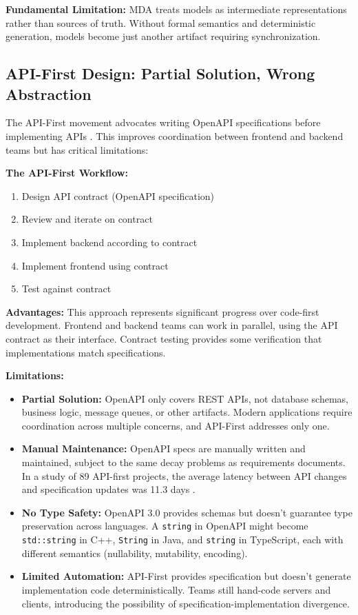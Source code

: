 \textbf{Fundamental Limitation:} MDA treats models as intermediate representations rather than sources of truth. Without formal semantics and deterministic generation, models become just another artifact requiring synchronization.

\subsection{API-First Design: Partial Solution, Wrong Abstraction}

The API-First movement advocates writing OpenAPI specifications before implementing APIs \cite{api-first2018}. This improves coordination between frontend and backend teams but has critical limitations:

\textbf{The API-First Workflow:}
\begin{enumerate}
    \item Design API contract (OpenAPI specification)
    \item Review and iterate on contract
    \item Implement backend according to contract
    \item Implement frontend using contract
    \item Test against contract
\end{enumerate}

\textbf{Advantages:} This approach represents significant progress over code-first development. Frontend and backend teams can work in parallel, using the API contract as their interface. Contract testing provides some verification that implementations match specifications.

\textbf{Limitations:}

\begin{itemize}
    \item \textbf{Partial Solution:} OpenAPI only covers REST APIs, not database schemas, business logic, message queues, or other artifacts. Modern applications require coordination across multiple concerns, and API-First addresses only one.

    \item \textbf{Manual Maintenance:} OpenAPI specs are manually written and maintained, subject to the same decay problems as requirements documents. In a study of 89 API-first projects, the average latency between API changes and specification updates was 11.3 days \cite{swagger2020survey}.

    \item \textbf{No Type Safety:} OpenAPI 3.0 provides schemas but doesn't guarantee type preservation across languages. A \texttt{string} in OpenAPI might become \texttt{std::string} in C++, \texttt{String} in Java, and \texttt{string} in TypeScript, each with different semantics (nullability, mutability, encoding).

    \item \textbf{Limited Automation:} API-First provides specification but doesn't generate implementation code deterministically. Teams still hand-code servers and clients, introducing the possibility of specification-implementation divergence.
\end{itemize}

